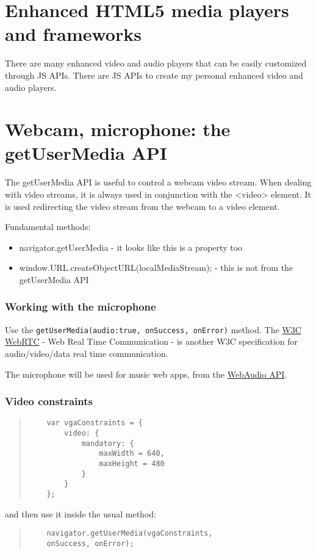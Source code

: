 \documentclass[a4paper,11pt]{book}
\begin{document}
	\section{Enhanced HTML5 media players and frameworks}
	There are many enhanced video and audio players that can be easily customized through JS APIs. There are
	JS APIs to create my personal enhanced video and audio players.
	
	\section{Webcam, microphone: the getUserMedia API}
	The getUserMedia API is useful to control a webcam video stream. When dealing with video streams, it is
	always used in conjunction with the <video> element. It is used redirecting the video stream from the
	webcam to a video element.
	
	Fundamental methods:
	\begin{itemize}
	\item navigator.getUserMedia - it looks like this is a property too
	\item window.URL.createObjectURL(localMediaStream); - this is not from the getUserMedia API
	\end{itemize}
	
	\subsubsection{Working with the microphone}
	Use the \texttt{getUserMedia({audio:true}, onSuccess, onError)} method.
	The \href{http://www.w3.org/TR/webrtc/}{W3C WebRTC} - Web Real Time Communication - is another W3C
	specification for audio/video/data real time communication.
	
	The microphone will be used for music web apps, from the \href{http://www.w3.org/TR/webaudio/}{WebAudio API}.
	
	\subsubsection{Video constraints}
	\begin{verse}
	\begin{verbatim}
	var vgaConstraints = {
		video: {
			mandatory: {
				maxWidth = 640,
				maxHeight = 480
			}
		}
	};
	\end{verbatim}
	\end{verse}
	and then use it inside the usual method:
	\begin{verse}
	\begin{verbatim}
	navigator.getUserMedia(vgaConstraints,
	onSuccess, onError);
	\end{verbatim}
	\end{verse}
	
\end{document}
